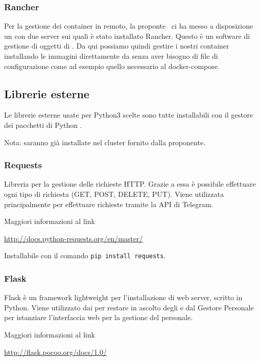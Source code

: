 \subsubsection{Rancher}
Per la gestione dei container in remoto, la proponte \II~ci ha messo a disposizione un  con due server sui quali è stato installato Rancher. Questo è un software di gestione di oggetti di .
Da qui possiamo quindi gestire i nostri container installando le immagini direttamente da  senza aver bisogno di file di configurazione come ad esempio quello necessario al docker-compose.


\subsection{Librerie esterne}

Le librerie esterne usate per Python3 scelte sono tutte installabili con il gestore dei pacchetti di Python .

Nota: saranno già installate nel cluster fornito dalla proponente.

\subsubsection{Requests}
Libreria per la gestione delle richieste HTTP. Grazie a essa è possibile effettuare ogni tipo di richiesta (GET, POST, DELETE, PUT).
Viene utilizzata principalmente per effettuare richieste tramite la API di Telegram.

Maggiori informazioni al link

\begin{center}
    \url{http://docs.python-requests.org/en/master/}
\end{center}

Installabile con il comando \texttt{pip install requests}.

\subsubsection{Flask}
Flask è un framework lightweight per l'installazione di web server, scritto in Python.
Viene utilizzato dai  per restare in ascolto degli  e dal Gestore Personale per istanziare l'interfaccia
web per la gestione del personale.

Maggiori informazioni al link

\begin{center}
    \url{http://flask.pocoo.org/docs/1.0/}
\end{center}

